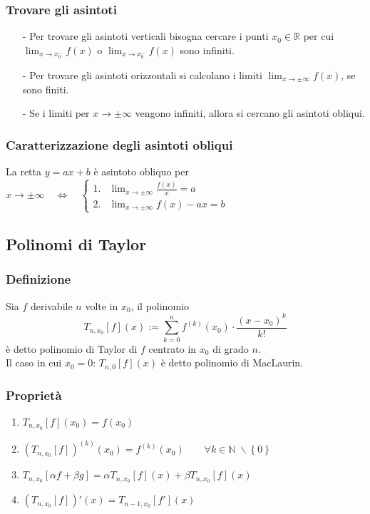 \documentclass[a4paper]{article}
\begin{document}
\subsubsection*{Trovare gli asintoti}
\begin{itemize}
	\item[-] Per trovare gli asintoti verticali bisogna cercare i punti \(x_0 \in \mathbb{R}\) per cui \(\displaystyle \lim_{x \to x_0^-} f(x)\) o
	\(\)\(\displaystyle \lim_{x \to x_0^-} f(x)\) sono infiniti.
	\item[-] Per trovare gli asintoti orizzontali si calcolano i limiti \(\displaystyle \lim_{x \to \pm \infty} f(x)\), se sono finiti.
	\item[-] Se i limiti per \(x \to \pm \infty\) vengono infiniti, allora si cercano gli asintoti obliqui.
\end{itemize}

\subsubsection*{Caratterizzazione degli asintoti obliqui}
La retta \(y = ax + b\) è asintoto obliquo per \(x \to \pm \infty \quad \Leftrightarrow \quad \begin{cases}
	\text{1.} &\displaystyle \lim_{x \to \pm \infty} \frac{f(x)}{x} = a \\
	\text{2.} &\displaystyle \lim_{x \to \pm \infty} f(x) - ax = b
\end{cases}\)

\newpage


\subsection{Polinomi di Taylor}
\subsubsection*{Definizione}
Sia \(f\) derivabile \(n\) volte in \(x_0\), il polinomio
\[T_{n,x_0}[f](x) := \sum_{k = 0}^{n} f^{(k)}(x_0) \cdot \frac{(x-x_0)^k}{k!}\]
è detto polinomio di Taylor di \(f\) centrato in \(x_0\) di grado \(n\). \\
Il caso in cui \(x_0 = 0\): \(\displaystyle T_{n,0}[f](x)\) è detto polinomio di MacLaurin.

\subsubsection*{Proprietà}
\begin{enumerate}
	\item \(T_{n,x_0}[f](x_0) = f(x_0)\)
	\item \(\left(T_{n,x_0}[f]\right)^{(k)}(x_0) = f^{(k)}(x_0) \qquad \forall k \in \mathbb{N} \; \backslash \left\{0\right\}\)
	\item \(T_{n,x_0}[\alpha f + \beta g] = \alpha T_{n,x_0}[f](x) + \beta T_{n,x_0}[f](x)\)
	\item \(\left(T_{n,x_0}[f]\right)'(x) = T_{n-1,x_0}[f'](x)\)
\end{enumerate}
\end{document}
